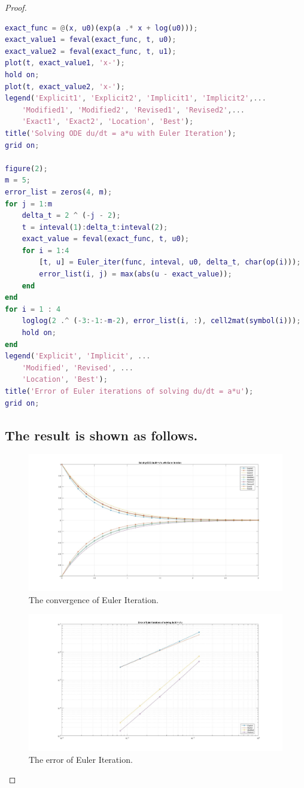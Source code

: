 \documentclass{article}
\begin{document}
\begin{proof}
\begin{lstlisting}[language = {MATLAB}]
exact_func = @(x, u0)(exp(a .* x + log(u0)));
exact_value1 = feval(exact_func, t, u0);
exact_value2 = feval(exact_func, t, u1);
plot(t, exact_value1, 'x-');
hold on;
plot(t, exact_value2, 'x-');
legend('Explicit1', 'Explicit2', 'Implicit1', 'Implicit2',...
    'Modified1', 'Modified2', 'Revised1', 'Revised2',...
    'Exact1', 'Exact2', 'Location', 'Best');
title('Solving ODE du/dt = a*u with Euler Iteration');
grid on;

figure(2);
m = 5;
error_list = zeros(4, m);
for j = 1:m
    delta_t = 2 ^ (-j - 2);
    t = inteval(1):delta_t:inteval(2);
    exact_value = feval(exact_func, t, u0);
    for i = 1:4
        [t, u] = Euler_iter(func, inteval, u0, delta_t, char(op(i)));
        error_list(i, j) = max(abs(u - exact_value));
    end
end
for i = 1 : 4
    loglog(2 .^ (-3:-1:-m-2), error_list(i, :), cell2mat(symbol(i)));
    hold on;
end
legend('Explicit', 'Implicit', ...
    'Modified', 'Revised', ...
    'Location', 'Best');
title('Error of Euler iterations of solving du/dt = a*u');
grid on;
\end{lstlisting}

\subsection{The result is shown as follows.}
\begin{figure}[htbp]
\centering
\includegraphics[width = 15cm]{converge.jpg}
\caption{The convergence of Euler Iteration.}
\label{Convergence}
\end{figure}
\begin{figure}[htbp]
\centering
\includegraphics[width = 15cm]{error_list.jpg}
\caption{The error of Euler Iteration.}
\label{Error}
\end{figure}
\end{proof}
\end{document}
